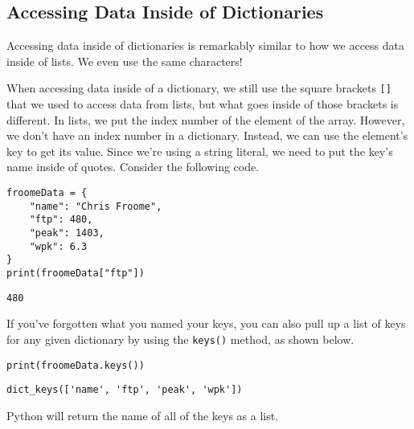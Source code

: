 \subsection{Accessing Data Inside of Dictionaries}
Accessing data inside of dictionaries is remarkably similar to how we access data inside of lists. We even use the same characters!\par
When accessing data inside of a dictionary, we still use the square brackets \verb|[]| that we used to access data from lists, but what goes inside of those brackets is different. In lists, we put the index number of the element of the array. However, we don't have an index number in a dictionary. Instead, we can use the element's key to get its value. Since we're using a string literal, we need to put the key's name inside of quotes. Consider the following code.\par
\begin{lstlisting}[style=pippython]
froomeData = {
    "name": "Chris Froome",
    "ftp": 480,
    "peak": 1403,
    "wpk": 6.3
}
print(froomeData["ftp"])
\end{lstlisting}
\begin{lstlisting}[style=none]
480
\end{lstlisting}
If you've forgotten what you named your keys, you can also pull up a list of keys for any given dictionary by using the \verb|keys()| method, as shown below.
\begin{lstlisting}[style=pippython]
print(froomeData.keys())
\end{lstlisting}
\begin{lstlisting}[style=none]
dict_keys(['name', 'ftp', 'peak', 'wpk'])
\end{lstlisting}
Python will return the name of all of the keys as a list.\par
